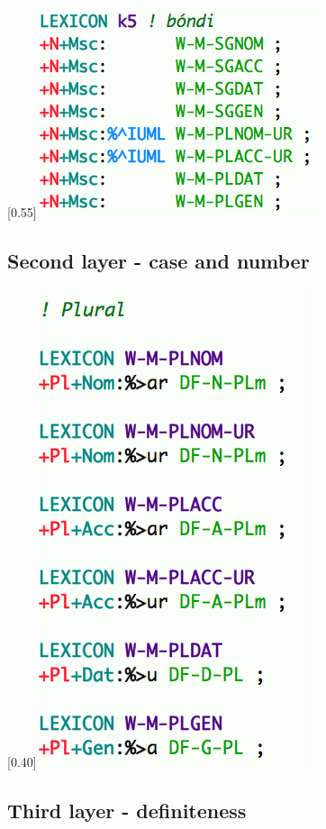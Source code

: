 \documentclass{article}
\begin{document}
\scalebox{0.55}[0.55]{\includegraphics{img/bondi.png}} \\\subsection{Second layer - case and number} 
\scalebox{0.40}[0.40]{\includegraphics{img/wmplnom.png}} \\\subsection{Third layer - definiteness} 
\end{document}
